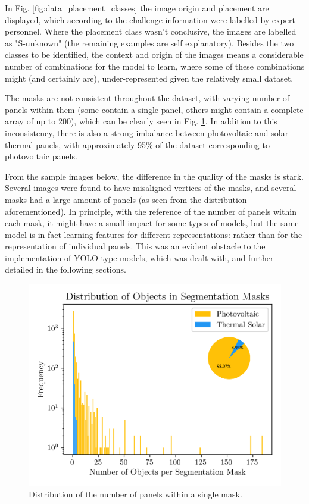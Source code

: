 \documentclass[conference]{IEEEtran}
\begin{document}
In Fig. \ref{fig:data_placement_classes} the image origin and placement are displayed, which according to the challenge information were labelled by expert personnel. Where the placement class wasn't conclusive, the images are labelled as "S-unknown" (the remaining examples are self explanatory). Besides the two classes to be identified, the context and origin of the images means a considerable number of combinations for the model to learn, where some of these combinations might (and certainly are), under-represented given the relatively small dataset.

The masks are not consistent throughout the dataset, with varying number of panels within them (some contain a single panel, others might contain a complete array of up to 200), which can be clearly seen in Fig. \ref{fig:data_objectdistribution}. In addition to this inconsistency, there is also a strong imbalance between photovoltaic and solar thermal panels, with approximately 95\% of the dataset corresponding to photovoltaic panels.

From the sample images below, the difference in the quality of the masks is stark. Several images were found to have misaligned vertices of the masks, and several masks had a large amount of panels (as seen from the distribution aforementioned). In principle, with the reference of the number of panels within each mask, it might have a small impact for some types of models, but the same model is in fact learning features for different representations: rather than for the representation of individual panels. This was an evident obstacle to the implementation of YOLO type models, which was dealt with, and further detailed in the following sections.

\begin{figure}[H]
    \centering
    \includegraphics[width=1\linewidth]{assets/data_objectdistribution_ph.png}
    \caption{Distribution of the number of panels within a single mask.}
    \label{fig:data_objectdistribution}
\end{figure}
\end{document}
